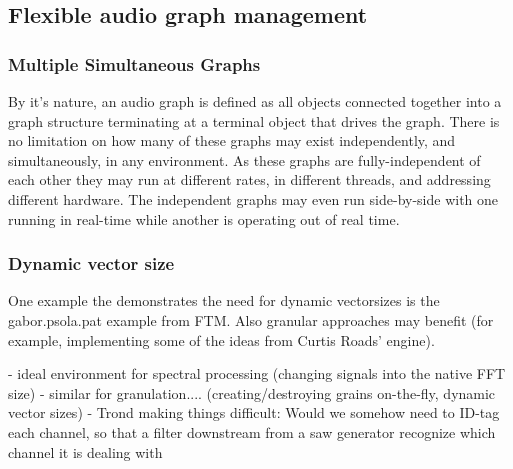 \documentclass[twoside,a4paper]{article}
\begin{document}
%   



\subsection{Flexible audio graph management} %

\subsubsection{Multiple Simultaneous Graphs} %

By it's nature, an audio graph is defined as all objects connected together into a graph structure terminating at a terminal object that drives the graph.  
There is no limitation on how many of these graphs may exist independently, and simultaneously, in any environment.  
As these graphs are fully-independent of each other they may run at different rates, in different threads, and addressing different hardware.  The independent graphs may even run side-by-side with one running in real-time while another is operating out of real time.



\subsubsection{Dynamic vector size} %


One example the demonstrates the need for dynamic vectorsizes is the gabor.psola.pat example from FTM. 
Also granular approaches may benefit (for example, implementing some of the ideas from Curtis Roads' engine).

- ideal environment for spectral processing (changing signals into the native FFT size)
- similar for granulation.... (creating/destroying grains on-the-fly, dynamic vector sizes)
- Trond making things difficult: Would we somehow need to ID-tag each channel, so that a filter downstream from a saw generator recognize which channel it is dealing with
\end{document}
